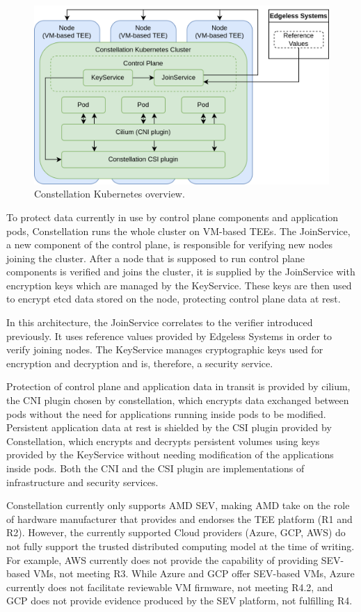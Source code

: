 \begin{figure}[H]
  \centering
  \includegraphics[width=0.8\linewidth]{resources/constellation-kubernetes.drawio.png}
  \caption{Constellation Kubernetes overview.}
\end{figure}

To protect data currently in use by control plane components and application
pods, Constellation runs the whole cluster on VM-based TEEs. The JoinService, a
new component of the control plane, is responsible for verifying new nodes
joining the cluster. After a node that is supposed to run control plane
components is verified and joins the cluster, it is supplied by the JoinService
with encryption keys which are managed by the KeyService. These keys are then
used to encrypt etcd data stored on the node, protecting control plane data at
rest.

In this architecture, the JoinService correlates to the verifier introduced
previously. It uses reference values provided by Edgeless Systems in order to
verify joining nodes. The KeyService manages cryptographic keys used for
encryption and decryption and is, therefore, a security service.

Protection of control plane and application data in transit is provided by
cilium, the CNI plugin chosen by constellation, which encrypts data exchanged
between pods without the need for applications running inside pods to be
modified. Persistent application data at rest is shielded by the CSI plugin
provided by Constellation, which encrypts and decrypts persistent volumes using
keys provided by the KeyService without needing modification of the applications
inside pods. Both the CNI and the CSI plugin are implementations of
infrastructure and security services.

Constellation currently only supports AMD SEV, making AMD take on the role of
hardware manufacturer that provides and endorses the TEE platform (R1 and R2).
However, the currently supported Cloud providers (Azure, GCP, AWS) do not fully
support the trusted distributed computing model at the time of writing. For
example, AWS currently does not provide the capability of providing SEV-based
VMs, not meeting R3. While Azure and GCP offer SEV-based VMs, Azure currently
does not facilitate reviewable VM firmware, not meeting R4.2, and GCP does not
provide evidence produced by the SEV platform, not fulfilling R4.


